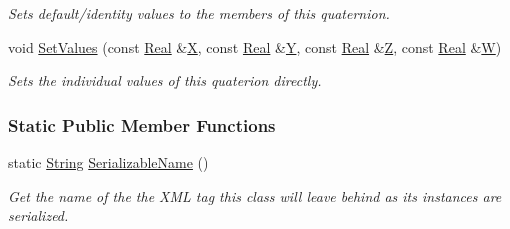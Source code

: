 \begin{DoxyCompactItemize}
\begin{DoxyCompactList}\small\item\em Sets default/identity values to the members of this quaternion. \item\end{DoxyCompactList}\item 
\hypertarget{classMezzanine_1_1Quaternion_a3d7b89abe15a85ecca72aa0a89d4c370}{
void \hyperlink{classMezzanine_1_1Quaternion_a3d7b89abe15a85ecca72aa0a89d4c370}{SetValues} (const \hyperlink{namespaceMezzanine_a726731b1a7df72bf3583e4a97282c6f6}{Real} \&\hyperlink{classMezzanine_1_1Quaternion_afe9d0fceef87816390f4181aadd9e683}{X}, const \hyperlink{namespaceMezzanine_a726731b1a7df72bf3583e4a97282c6f6}{Real} \&\hyperlink{classMezzanine_1_1Quaternion_ae0170f8f57a3471921a312413df42151}{Y}, const \hyperlink{namespaceMezzanine_a726731b1a7df72bf3583e4a97282c6f6}{Real} \&\hyperlink{classMezzanine_1_1Quaternion_a1d93e9f132b4e7c71127f2b307c998db}{Z}, const \hyperlink{namespaceMezzanine_a726731b1a7df72bf3583e4a97282c6f6}{Real} \&\hyperlink{classMezzanine_1_1Quaternion_a0efb51aeabeecf63fd30966ea68a0cdc}{W})}
\label{classMezzanine_1_1Quaternion_a3d7b89abe15a85ecca72aa0a89d4c370}

\begin{DoxyCompactList}\small\item\em Sets the individual values of this quaterion directly. \item\end{DoxyCompactList}\end{DoxyCompactItemize}
\subsubsection*{Static Public Member Functions}
\begin{DoxyCompactItemize}
\item 
static \hyperlink{namespaceMezzanine_acf9fcc130e6ebf08e3d8491aebcf1c86}{String} \hyperlink{classMezzanine_1_1Quaternion_aac67ed7f8940dfaaf7fc0374d17fd7c8}{SerializableName} ()
\begin{DoxyCompactList}\small\item\em Get the name of the the XML tag this class will leave behind as its instances are serialized. \item\end{DoxyCompactList}\end{DoxyCompactItemize}
